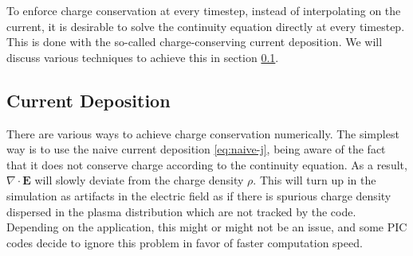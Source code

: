 To enforce charge conservation at every timestep, instead of interpolating on
the current, it is desirable to solve the continuity equation directly at every
timestep. This is done with the so-called charge-conserving current deposition.
We will discuss various techniques to achieve this in section
\ref{sec:charge-cons-curr}.




\subsection{Current Deposition}
\label{sec:charge-cons-curr}

There are various ways to achieve charge conservation numerically. The simplest
way is to use the naive current deposition \eqref{eq:naive-j}, being aware of
the fact that it does not conserve charge according to the continuity equation.
As a result, $\nabla\cdot \mathbf{E}$ will slowly deviate from the charge
density $\rho$. This will turn up in the simulation as artifacts in the electric
field as if there is spurious charge density dispersed in the plasma
distribution which are not tracked by the code. Depending on the application,
this might or might not be an issue, and some PIC codes decide to ignore this
problem in favor of faster computation speed.

